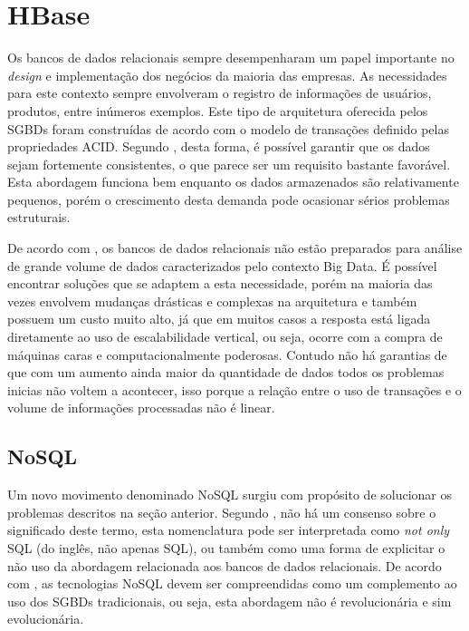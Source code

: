 \section{HBase}

Os bancos de dados relacionais sempre desempenharam um papel importante no \textit{design} e implementação dos negócios da maioria das empresas. As necessidades para este contexto sempre envolveram o registro de informações de usuários, produtos, entre inúmeros exemplos. Este tipo de arquitetura oferecida pelos SGBDs foram construídas de acordo com o modelo de transações definido pelas propriedades ACID. Segundo , desta forma, é possível garantir que os dados sejam fortemente consistentes, o que parece ser um requisito bastante favorável. Esta abordagem funciona bem enquanto os dados armazenados são relativamente pequenos, porém o crescimento desta demanda pode ocasionar sérios problemas estruturais.

De acordo com , os bancos de dados relacionais não estão preparados para análise de grande volume de dados caracterizados pelo contexto Big Data. É possível encontrar soluções que se adaptem a esta necessidade, porém na maioria das vezes envolvem mudanças drásticas e complexas na arquitetura e também possuem um custo muito alto, já que em muitos casos a resposta está ligada diretamente ao uso de escalabilidade vertical, ou seja, ocorre com a compra de máquinas caras e computacionalmente poderosas. Contudo não há garantias de que com um aumento ainda maior da quantidade de dados todos os problemas inicias não voltem a acontecer, isso porque a relação entre o uso de transações e o volume de informações processadas não é linear.

\subsection{NoSQL}

Um novo movimento denominado NoSQL surgiu com propósito de solucionar os problemas  descritos na seção anterior. Segundo , não há um consenso sobre o significado deste termo, esta nomenclatura pode ser interpretada como \textit{not only} SQL (do inglês, não apenas SQL), ou também como uma forma de explicitar o não uso da abordagem relacionada aos bancos de dados relacionais. De acordo com , as tecnologias NoSQL devem ser compreendidas como um complemento ao uso dos SGBDs tradicionais, ou seja, esta abordagem não é revolucionária e sim evolucionária. 

